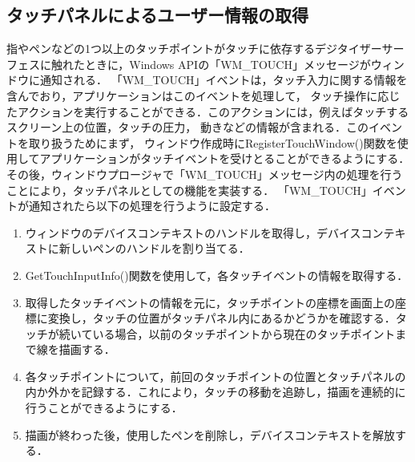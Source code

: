 \subsection{タッチパネルによるユーザー情報の取得}
指やペンなどの1つ以上のタッチポイントがタッチに依存するデジタイザーサーフェスに触れたときに，Windows APIの「WM\_TOUCH」メッセージがウィンドウに通知される\cite{Win32API-reference}．
「WM\_TOUCH」イベントは，タッチ入力に関する情報を含んでおり，アプリケーションはこのイベントを処理して，
タッチ操作に応じたアクションを実行することができる．このアクションには，例えばタッチするスクリーン上の位置，タッチの圧力，
動きなどの情報が含まれる．このイベントを取り扱うためにまず，
ウィンドウ作成時にRegisterTouchWindow()関数を使用してアプリケーションがタッチイベントを受けとることができるようにする．
その後，ウィンドウプロージャで「WM\_TOUCH」メッセージ内の処理を行うことにより，タッチパネルとしての機能を実装する．
「WM\_TOUCH」イベントが通知されたら以下の処理を行うように設定する．
\begin{enumerate}[leftmargin=*]
  \item ウィンドウのデバイスコンテキストのハンドルを取得し，デバイスコンテキストに新しいペンのハンドルを割り当てる．
  \item GetTouchInputInfo()関数を使用して，各タッチイベントの情報を取得する．
  \item 取得したタッチイベントの情報を元に，タッチポイントの座標を画面上の座標に変換し，タッチの位置がタッチパネル内にあるかどうかを確認する．タッチが続いている場合，以前のタッチポイントから現在のタッチポイントまで線を描画する．
  \item 各タッチポイントについて，前回のタッチポイントの位置とタッチパネルの内か外かを記録する．これにより，タッチの移動を追跡し，描画を連続的に行うことができるようにする．
  \item 描画が終わった後，使用したペンを削除し，デバイスコンテキストを解放する．
\end{enumerate}
